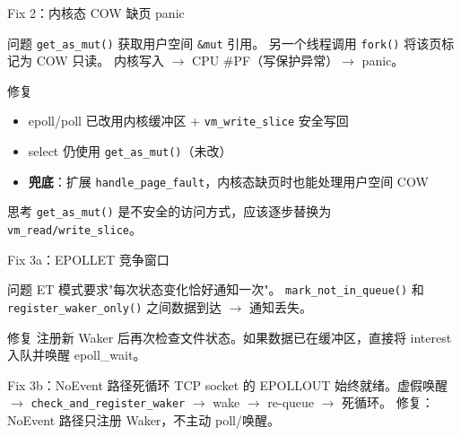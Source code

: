 \documentclass{beamer}
\begin{document}

\begin{frame}{Fix 2：内核态 COW 缺页 panic}
  \begin{block}{问题}
    \texttt{get\_as\_mut()} 获取用户空间 \texttt{\&mut} 引用。
    另一个线程调用 \texttt{fork()} 将该页标记为 COW 只读。
    内核写入 $\to$ CPU \#PF（写保护异常）$\to$ panic。
  \end{block}
  \begin{block}{修复}
    \begin{itemize}
      \setlength{\itemsep}{4pt}
      \item epoll/poll 已改用内核缓冲区 + \texttt{vm\_write\_slice} 安全写回
      \item select 仍使用 \texttt{get\_as\_mut()}（未改）
      \item \textbf{兜底}：扩展 \texttt{handle\_page\_fault}，内核态缺页时也能处理用户空间 COW
    \end{itemize}
  \end{block}
  \begin{block}{思考}
    \texttt{get\_as\_mut()} 是不安全的访问方式，应该逐步替换为 \texttt{vm\_read/write\_slice}。
  \end{block}
\end{frame}


\begin{frame}{Fix 3a：EPOLLET 竞争窗口}
  \begin{block}{问题}
    ET 模式要求"每次状态变化恰好通知一次"。
    \texttt{mark\_not\_in\_queue()} 和 \texttt{register\_waker\_only()} 之间数据到达 $\to$ 通知丢失。
  \end{block}
  \begin{block}{修复}
    注册新 Waker 后再次检查文件状态。如果数据已在缓冲区，直接将 interest 入队并唤醒 epoll\_wait。
  \end{block}
  \begin{block}{Fix 3b：NoEvent 路径死循环}
    TCP socket 的 EPOLLOUT 始终就绪。虚假唤醒 $\to$ \texttt{check\_and\_register\_waker} $\to$ wake $\to$ re-queue $\to$ 死循环。
    修复：NoEvent 路径只注册 Waker，不主动 poll/唤醒。
  \end{block}
\end{frame}

\end{document}

